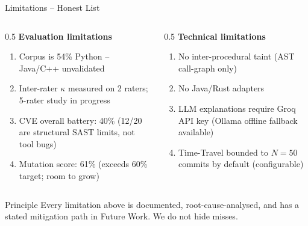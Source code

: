 \documentclass[aspectratio=169,12pt]{beamer}
\begin{document}
\begin{frame}{Limitations -- Honest List}
  \begin{columns}[T]
    \begin{column}{0.5\textwidth}
      \textbf{Evaluation limitations}
      \begin{enumerate}\small
        \item Corpus is 54\% Python -- Java/C++ unvalidated
        \item Inter-rater $\kappa$ measured on 2 raters; 5-rater study in progress
        \item CVE overall battery: 40\% (12/20 are structural SAST limits, not tool bugs)
        \item Mutation score: 61\% (exceeds 60\% target; room to grow)
      \end{enumerate}
    \end{column}
    \begin{column}{0.5\textwidth}
      \textbf{Technical limitations}
      \begin{enumerate}\small
        \item No inter-procedural taint (AST call-graph only)
        \item No Java/Rust adapters
        \item LLM explanations require Groq API key (Ollama offline fallback available)
        \item Time-Travel bounded to $N=50$ commits by default (configurable)
      \end{enumerate}
    \end{column}
  \end{columns}
  \vspace{4pt}
  \begin{alertblock}{Principle}
    Every limitation above is documented, root-cause-analysed, and has a
    stated mitigation path in Future Work. We do not hide misses.
  \end{alertblock}
\end{frame}
\end{document}

